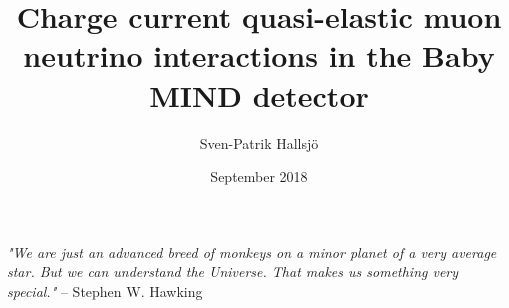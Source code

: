 \documentclass[oneside,hidelinks]{glasgowthesis}
\begin{document}
\pagestyle{empty}

\title{Charge current quasi-elastic muon neutrino interactions in the Baby MIND detector}
\author{Sven-Patrik Hallsj{\"o}}
\date{September 2018}

\maketitle

\cleardoublepage

 

\cleardoublepage
\vspace*{1.75in}

\textit{"We are just an advanced breed of monkeys on a minor planet of a very average star. But we can understand the Universe. That makes us something very special."} -- Stephen W. Hawking%



\newpage
 

\newpage
 







\end{document}
